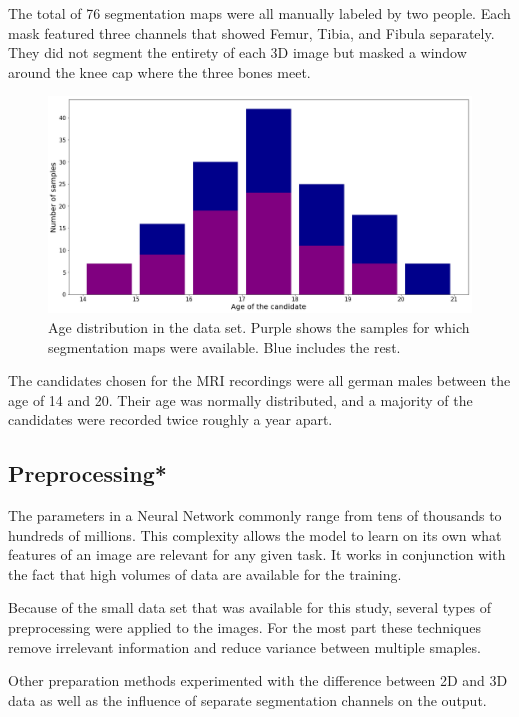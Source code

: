 The total of 76 segmentation maps were all manually labeled by two people. Each mask featured three channels that showed Femur, Tibia, and Fibula separately. They did not segment the entirety of each 3D image but masked a window around the knee cap where the three bones meet.

\begin{figure}[H]
\centering
\par
\includegraphics[width=1.0\textwidth]{imgs/age_distr.png}
\caption{Age distribution in the data set. Purple shows the samples for which segmentation maps were available. Blue includes the rest.}
\par
\end{figure}

The candidates chosen for the MRI recordings were all german males between the age of 14 and 20. Their age was normally distributed, and a majority of the candidates were recorded twice roughly a year apart.

\subsection{Preprocessing*}

The parameters in a Neural Network commonly range from tens of thousands to hundreds of millions. This complexity allows the model to learn on its own what features of an image are relevant for any given task. It works in conjunction with the fact that high volumes of data are available for the training.

Because of the small data set that was available for this study, several types of preprocessing were applied to the images. For the most part these techniques remove irrelevant information and reduce variance between multiple smaples.

Other preparation methods experimented with the difference between 2D and 3D data as well as the influence of separate segmentation channels on the output.

